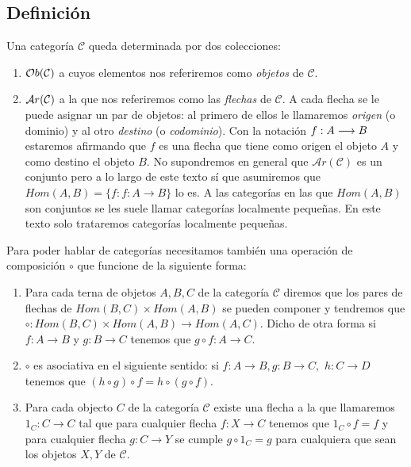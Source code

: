 \subsection{Definición}

Una categoría $\mathcal{C}$ queda determinada por dos colecciones:

\begin{enumerate}
\item $\mathcal{O}b(\mathcal{C})$ a cuyos elementos nos referiremos como
  \emph{objetos} de $\mathcal{C}$.
\item $\mathcal{A}r(\mathcal{C})$ a la que nos referiremos como las
  \emph{flechas} de $\mathcal{C}$. A cada flecha se le puede asignar
  un par de objetos: al primero de ellos le llamaremos \emph{origen}
  (o dominio) y al otro \emph{destino} (o \emph{codominio}). Con la notación
  $f : A\longrightarrow B$ estaremos afirmando que $f$ es una flecha
  que tiene como origen el objeto $A$ y como destino el objeto $B$.
  No supondremos en general que $\mathcal{A}r(\mathcal{C})$ es un
  conjunto pero a lo largo de este texto sí que asumiremos que
  $Hom(A, B) = \{ f: f : A \longrightarrow B \}$ lo es. A las categorías
  en las que $Hom(A, B)$ son conjuntos se les suele llamar categorías
  localmente pequeñas. En este texto solo trataremos categorías
  localmente pequeñas.
\end{enumerate}
Para poder hablar de categorías necesitamos también una operación de composición $\circ$ que funcione de la siguiente
forma:

\begin{enumerate}
\item Para cada terna de objetos $A, B, C$ de la categoría $\mathcal{C}$
  diremos que los pares de flechas de $Hom(B, C)\times Hom(A, B)$ se
  pueden componer y tendremos que
  $\circ : Hom(B, C)\times Hom(A, B) \rightarrow Hom(A, C)$. Dicho
  de otra forma si $f: A\longrightarrow B$ y $g : B \longrightarrow C$
  tenemos que $g \circ f : A \longrightarrow C$.
\item $\circ$ es asociativa en el siguiente sentido: si
  $f : A \longrightarrow B, g: B \longrightarrow C,$
  $h : C \longrightarrow D$ tenemos que
  $(h \circ g) \circ f = h \circ (g \circ f)$.
\item Para cada objecto $C$ de la categoría $\mathcal{C}$ existe una
  flecha a la que llamaremos $1_C : C \longrightarrow C$ tal que
  para cualquier flecha $f: X \longrightarrow C$ tenemos que
  $1_C \circ f = f$ y para cualquier flecha $g : C \longrightarrow Y$
  se cumple $g \circ 1_C = g$ para cualquiera que sean los objetos
  $X, Y$ de $\mathcal{C}$.
\end{enumerate}

